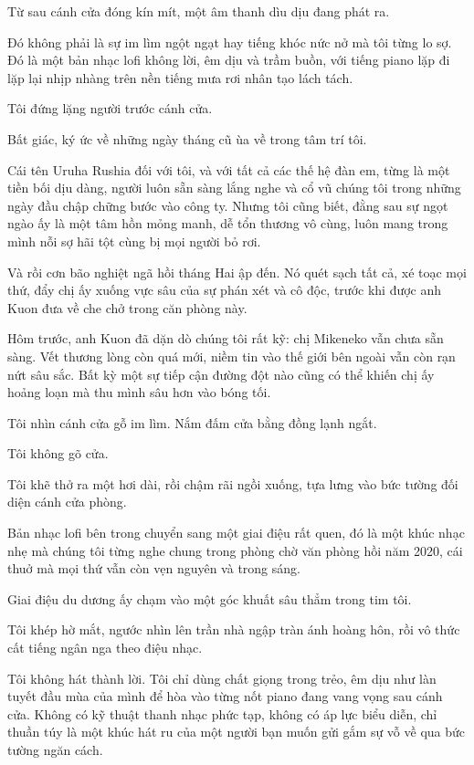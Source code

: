 \documentclass[../main.tex]{subfiles}
\begin{document}
Từ sau cánh cửa đóng kín mít, một âm thanh dìu dịu đang phát ra.

Đó không phải là sự im lìm ngột ngạt hay tiếng khóc nức nở mà tôi từng lo sợ. Đó là một bản nhạc lofi không lời, êm dịu và trầm buồn, với tiếng piano lặp đi lặp lại nhịp nhàng trên nền tiếng mưa rơi nhân tạo lách tách.

Tôi đứng lặng người trước cánh cửa.

Bất giác, ký ức về những ngày tháng cũ ùa về trong tâm trí tôi.

Cái tên Uruha Rushia đối với tôi, và với tất cả các thế hệ đàn em, từng là một tiền bối dịu dàng, người luôn sẵn sàng lắng nghe và cổ vũ chúng tôi trong những ngày đầu chập chững bước vào công ty. Nhưng tôi cũng biết, đằng sau sự ngọt ngào ấy là một tâm hồn mỏng manh, dễ tổn thương vô cùng, luôn mang trong mình nỗi sợ hãi tột cùng bị mọi người bỏ rơi.

Và rồi cơn bão nghiệt ngã hồi tháng Hai ập đến. Nó quét sạch tất cả, xé toạc mọi thứ, đẩy chị  ấy xuống vực sâu của sự phán xét và cô độc, trước khi được anh Kuon đưa về che chở trong căn phòng này.

Hôm trước, anh Kuon đã dặn dò chúng tôi rất kỹ: chị Mikeneko vẫn chưa sẵn sàng. Vết thương lòng còn quá mới, niềm tin vào thế giới bên ngoài vẫn còn rạn nứt sâu sắc. Bất kỳ một sự tiếp cận đường đột nào cũng có thể khiến chị ấy hoảng loạn mà thu mình sâu hơn vào bóng tối.

Tôi nhìn cánh cửa gỗ im lìm. Nắm đấm cửa bằng đồng lạnh ngắt.

Tôi không gõ cửa.

Tôi khẽ thở ra một hơi dài, rồi chậm rãi ngồi xuống, tựa lưng vào bức tường đối diện cánh cửa phòng.

Bản nhạc lofi bên trong chuyển sang một giai điệu rất quen, đó là một khúc nhạc nhẹ mà chúng tôi từng nghe chung trong phòng chờ văn phòng hồi năm 2020, cái thuở mà mọi thứ vẫn còn vẹn nguyên và trong sáng.

Giai điệu du dương ấy chạm vào một góc khuất sâu thẳm trong tim tôi.

Tôi khép hờ mắt, ngước nhìn lên trần nhà ngập tràn ánh hoàng hôn, rồi vô thức cất tiếng ngân nga theo điệu nhạc.

Tôi không hát thành lời. Tôi chỉ dùng chất giọng trong trẻo, êm dịu như làn tuyết đầu mùa của mình để hòa vào từng nốt piano đang vang vọng sau cánh cửa. Không có kỹ thuật thanh nhạc phức tạp, không có áp lực biểu diễn, chỉ thuần túy là một khúc hát ru của một người bạn muốn gửi gắm sự vỗ về qua bức tường ngăn cách.
\end{document}
